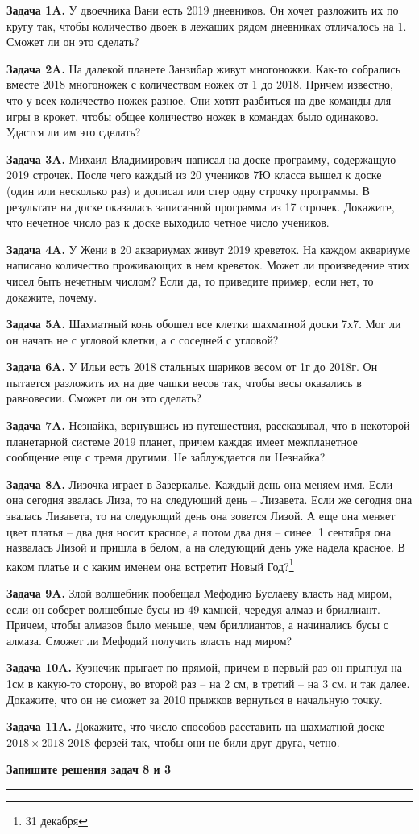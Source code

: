 \textbf{Задача 1A.} У двоечника Вани есть 2019 дневников. Он хочет разложить их по кругу так, чтобы количество двоек в лежащих рядом дневниках отличалось на 1. Сможет ли он это сделать?

\textbf{Задача 2A.} На далекой планете Занзибар живут многоножки. Как-то собрались вместе 2018 многоножек с количеством ножек от 1 до 2018. Причем известно, что у всех количество ножек разное. Они хотят разбиться на две команды для игры в крокет, чтобы общее количество ножек в командах было одинаково. Удастся ли им это сделать?

\textbf{Задача 3A.} Михаил Владимирович написал на доске программу, содержащую 2019 строчек. После чего каждый из 20 учеников 7Ю класса вышел к доске (один или несколько раз) и дописал или стер одну строчку программы. В результате на доске оказалась записанной программа из 17 строчек. Докажите, что нечетное число раз к доске выходило четное число учеников.

\textbf{Задача 4A.} У Жени в 20 аквариумах живут 2019 креветок. На каждом аквариуме написано количество проживающих в нем креветок. Может ли произведение этих чисел быть нечетным числом? Если да, то приведите пример, если нет, то докажите, почему.

\textbf{Задача 5A.} Шахматный конь обошел все клетки шахматной доски 7х7. Мог ли он начать не с угловой клетки, а с соседней с угловой?

\textbf{Задача 6A.} У Ильи есть 2018 стальных шариков весом от 1г до 2018г. Он пытается разложить их на две чашки весов так, чтобы весы оказались в равновесии. Сможет ли он это сделать?

\textbf{Задача 7A.} Незнайка, вернувшись из путешествия, рассказывал, что в некоторой планетарной системе 2019 планет, причем каждая имеет межпланетное сообщение еще с тремя другими. Не заблуждается ли Незнайка?

\textbf{Задача 8A.} Лизочка играет в Зазеркалье. Каждый день она меняем имя. Если она сегодня звалась Лиза, то на следующий день -- Лизавета. Если же сегодня она звалась Лизавета, то на следующий день она зовется Лизой. А еще она меняет цвет платья -- два дня носит красное, а потом два дня -- синее. 1 сентября она назвалась Лизой и пришла в белом, а на следующий день уже надела красное. В каком платье и с каким именем она встретит Новый Год?\footnote{31 декабря} 

\textbf{Задача 9A.} Злой волшебник пообещал Мефодию Буслаеву власть над миром, если он соберет волшебные бусы из 49 камней, чередуя алмаз и бриллиант. Причем, чтобы алмазов было меньше, чем бриллиантов, а начинались бусы с алмаза. Сможет ли Мефодий получить власть над миром?

\textbf{Задача 10A.} Кузнечик прыгает по прямой, причем в первый раз он прыгнул на 1см в какую-то сторону, во второй раз -- на 2 см, в третий -- на 3 см, и так далее. Докажите, что он не сможет за 2010 прыжков вернуться в начальную точку.

\textbf{Задача 11A.} Докажите, что число способов расставить на шахматной доске $ 2018\times2018 $ 2018 ферзей так, чтобы они не били друг друга, четно.

\textbf{Запишите решения задач  8  и  3}
\hrule
